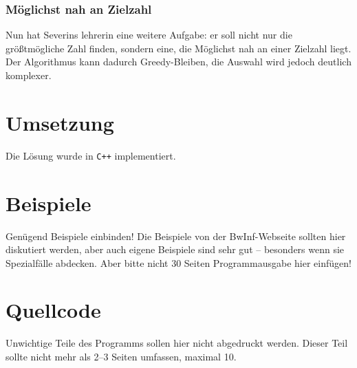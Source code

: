 \documentclass[a4paper,10pt,ngerman]{scrartcl}
\begin{document}
\subsubsection{Möglichst nah an Zielzahl}
Nun hat Severins lehrerin eine weitere Aufgabe: er soll nicht nur die größtmögliche Zahl finden, sondern eine, die Möglichst nah an einer Zielzahl liegt. Der Algorithmus kann dadurch Greedy-Bleiben, die Auswahl wird jedoch deutlich komplexer.



\section{Umsetzung}
Die Lösung wurde in \texttt{C++} implementiert. 

\section{Beispiele}
Genügend Beispiele einbinden! Die Beispiele von der BwInf-Webseite sollten hier diskutiert werden, aber auch eigene Beispiele sind sehr gut – besonders wenn sie Spezialfälle abdecken. Aber bitte nicht 30 Seiten Programmausgabe hier einfügen!

\section{Quellcode}
Unwichtige Teile des Programms sollen hier nicht abgedruckt werden. Dieser Teil sollte nicht mehr als 2–3 Seiten umfassen, maximal 10.
\end{document}
